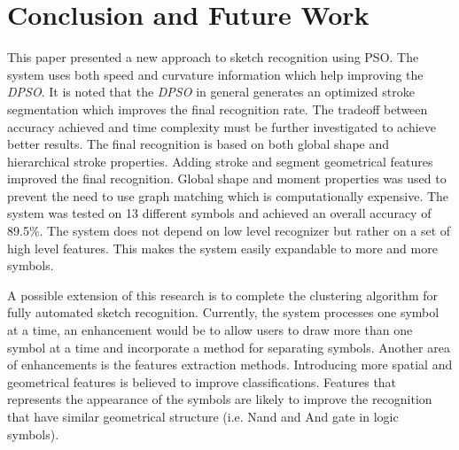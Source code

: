 \documentclass[preprint,10pt,5p,twocolumn]{elsarticle}
\begin{document}
\section{Conclusion and Future Work}
\label{ConclusionandFutureWork}
This paper presented a new approach to sketch recognition using PSO. The system uses both speed and curvature information which help improving the \textit{DPSO}. It is noted that the \textit{DPSO} in general generates an optimized stroke segmentation which improves the final recognition rate.  The tradeoff between accuracy achieved and time complexity must be further investigated to achieve better results. The final recognition is based on both global shape and hierarchical stroke properties. Adding stroke and segment geometrical features improved the final recognition. Global shape and moment properties was used to prevent the need to use graph matching which is computationally expensive. The system was tested on 13 different symbols and achieved an overall accuracy of 89.5\%. The system does not depend on low level recognizer but rather on a set of high level features. This makes the system easily expandable to more and more symbols. 

 A possible extension of this research is to complete the clustering algorithm for fully automated sketch recognition. Currently, the system processes one symbol at a time, an enhancement would be to allow users to draw more than one symbol at a time and incorporate a method for separating symbols. Another area of enhancements is the features extraction methods. Introducing more spatial and geometrical features is believed to improve classifications. Features that represents the appearance of the symbols are likely to improve the recognition that have similar geometrical structure (i.e. Nand and And gate in logic symbols).  
  
%

\end{document}
